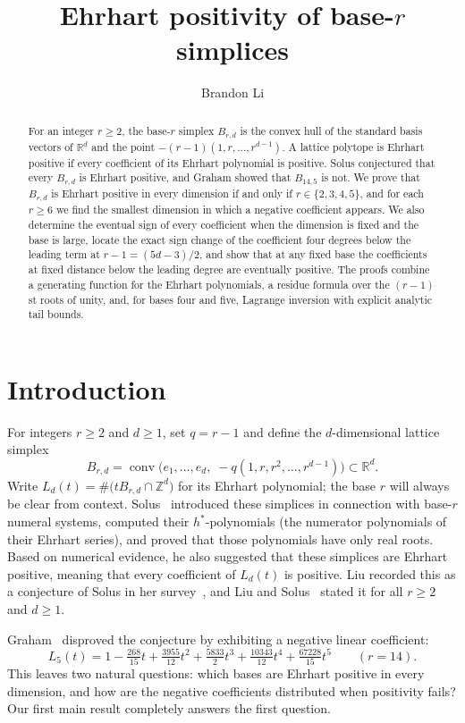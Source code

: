 \documentclass[11pt]{amsart}
\title{Ehrhart positivity of base-$r$ simplices}
\author{Brandon Li}
\theoremstyle{remark}
\newcommand{\Z}{\mathbb{Z}}
\newcommand{\R}{\mathbb{R}}
\begin{document}
\begin{abstract}
For an integer $r\ge2$, the base-$r$ simplex $B_{r,d}$ is the convex hull of
the standard basis vectors of $\R^d$ and the point $-(r-1)(1,r,\ldots,r^{d-1})$.
A lattice polytope is Ehrhart positive if every coefficient of its Ehrhart
polynomial is positive. Solus conjectured that every $B_{r,d}$ is Ehrhart
positive, and Graham showed that $B_{14,5}$ is not. We prove that $B_{r,d}$ is
Ehrhart positive in every dimension if and only if $r\in\{2,3,4,5\}$, and for
each $r\ge6$ we find the smallest dimension in which a negative coefficient
appears. We also determine the eventual sign of every coefficient when the
dimension is fixed and the base is large, locate the exact sign change of the
coefficient four degrees below the leading term at $r-1=(5d-3)/2$, and show
that at any fixed base the coefficients at fixed distance below the leading
degree are eventually positive. The proofs combine a generating function for
the Ehrhart polynomials, a residue formula over the $(r-1)$st roots of unity,
and, for bases four and five, Lagrange inversion with explicit analytic tail
bounds.
\end{abstract}
\maketitle

\section{Introduction}

For integers $r\ge2$ and $d\ge1$, set $q=r-1$ and define the $d$-dimensional
lattice simplex
\[
 B_{r,d}=\operatorname{conv}\bigl(e_1,\ldots,e_d,\;-q(1,r,r^2,\ldots,r^{d-1})\bigr)\subset\R^d .
\]
Write $L_d(t)=\#\bigl(tB_{r,d}\cap\Z^d\bigr)$ for its Ehrhart polynomial; the
base $r$ will always be clear from context. Solus~\cite{Sol} introduced these
simplices in connection with base-$r$ numeral systems, computed their
$h^*$-polynomials (the numerator polynomials of their Ehrhart series), and
proved that those polynomials have only real roots. Based on numerical
evidence, he also suggested that these simplices are Ehrhart positive, meaning
that every coefficient of $L_d(t)$ is positive. Liu recorded this as a
conjecture of Solus in her survey~\cite{Liu}, and Liu and
Solus~\cite[Conjecture~2.2]{LS} stated it for all $r\ge2$ and $d\ge1$.

Graham~\cite{Gra} disproved the conjecture by exhibiting a negative linear
coefficient:
\[
 L_5(t)=1-\tfrac{268}{15}t+\tfrac{3955}{12}t^2+\tfrac{5833}{2}t^3
 +\tfrac{10343}{12}t^4+\tfrac{67228}{15}t^5\qquad(r=14).
\]
This leaves two natural questions: which bases are Ehrhart positive in every
dimension, and how are the negative coefficients distributed when positivity
fails? Our first main result completely answers the first question.
\end{document}
